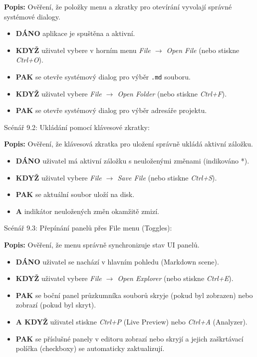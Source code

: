 \documentclass[12pt, a4paper]{article}
\begin{document}
\textbf{Popis:} Ověření, že položky menu a zkratky pro otevírání vyvolají správné systémové dialogy.
\begin{itemize}
    \item \textbf{DÁNO} aplikace je spuštěna a aktivní.
    \item \textbf{KDYŽ} uživatel vybere v horním menu \textit{File $\rightarrow$ Open File} (nebo stiskne \textit{Ctrl+O}).
    \item \textbf{PAK} se otevře systémový dialog pro výběr \texttt{.md} souboru.
    \item \textbf{KDYŽ} uživatel vybere \textit{File $\rightarrow$ Open Folder} (nebo stiskne \textit{Ctrl+F}).
    \item \textbf{PAK} se otevře systémový dialog pro výběr adresáře projektu.
\end{itemize}

Scénář 9.2: Ukládání pomocí klávesové zkratky:

\textbf{Popis:} Ověření, že klávesová zkratka pro uložení správně ukládá aktivní záložku.
\begin{itemize}
    \item \textbf{DÁNO} uživatel má aktivní záložku s neuloženými změnami (indikováno *).
    \item \textbf{KDYŽ} uživatel vybere \textit{File $\rightarrow$ Save File} (nebo stiskne \textit{Ctrl+S}).
    \item \textbf{PAK} se aktuální soubor uloží na disk.
    \item \textbf{A} indikátor neuložených změn okamžitě zmizí.
\end{itemize}

Scénář 9.3: Přepínání panelů přes File menu (Toggles):

\textbf{Popis:} Ověření, že menu správně synchronizuje stav UI panelů.
\begin{itemize}
    \item \textbf{DÁNO} uživatel se nachází v hlavním pohledu (Markdown scene).
    \item \textbf{KDYŽ} uživatel vybere \textit{File $\rightarrow$ Open Explorer} (nebo stiskne \textit{Ctrl+E}).
    \item \textbf{PAK} se boční panel průzkumníka souborů skryje (pokud byl zobrazen) nebo zobrazí (pokud byl skryt).
    \item \textbf{A KDYŽ} uživatel stiskne \textit{Ctrl+P} (Live Preview) nebo \textit{Ctrl+A} (Analyzer).
    \item \textbf{PAK} se příslušné panely v editoru zobrazí nebo skryjí a jejich zaškrtávací políčka (checkboxy) se automaticky zaktualizují.
\end{itemize}
\end{document}

